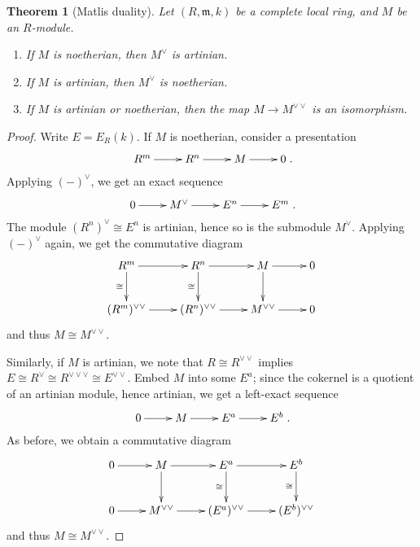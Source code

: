 \documentclass[11pt]{book}
\newtheorem{theorem}{Theorem}[chapter]
\numberwithin{equation}{section}
\numberwithin{theorem}{chapter}
\theoremstyle{definition}
\newtheorem{example}[theorem]{Example}
\newtheorem*{basic properties}{Basic Properties}
\newtheorem*{Important Remark}{Important Remark}
\theoremstyle{remark}
\newcommand{\m}{\mathfrak{m}}
\begin{document}
%



\begin{theorem}[Matlis duality]
	Let $(R,\m,k)$ be a complete local ring, and $M$ be an $R$-module.
	\begin{enumerate}
		\item If $M$ is noetherian, then $M^\vee$ is artinian.
		\item If $M$ is artinian, then $M^\vee$ is noetherian.
		\item If $M$ is artinian or noetherian, then the map $M \longrightarrow M^{\vee \vee}$ is an isomorphism.
	\end{enumerate}
\end{theorem}

\begin{proof}
	Write $E = E_R(k)$. If $M$ is noetherian, consider a presentation
	$$\xymatrix{R^m \ar[r] & R^n \ar[r] & M \ar[r] & 0}.$$
	Applying $(-)^{\vee}$, we get an exact sequence 
	$$\xymatrix{0 \ar[r] & M^{\vee} \ar[r] & E^n \ar[r] & E^m}.$$
	The module $(R^n)^{\vee} \cong E^n$ is artinian, hence so is the submodule $M^{\vee}$. Applying $(-)^{\vee}$ again, we get the commutative diagram
	$$\xymatrix{R^m \ar[d]_-{\cong} \ar[r] & R^n \ar[d]_-{\cong} \ar[r] & M \ar[d] \ar[r] & 0 \\
	(R^m)^{\vee \vee} \ar[r] & (R^n)^{\vee \vee} \ar[r] & M^{\vee \vee} \ar[r] & 0}$$
	and thus $M \cong M^{\vee \vee}$.
	
	Similarly, if $M$ is artinian, we note that $R\cong R^{\vee\vee}$ implies $E \cong R^{\vee} \cong R^{\vee \vee \vee} \cong E^{\vee\vee}$. Embed $M$ into some $E^a$; since the cokernel is a quotient of an artinian module, hence artinian, we get a left-exact sequence
	$$\xymatrix{0 \ar[r] & M \ar[r] & E^a \ar[r] & E^b}.$$
	As before, we obtain a commutative diagram
		$$ \xymatrix{ 0 \ar[r] & M\ar[d] \ar[r] &E^a \ar[d]_-{\cong} \ar[r] & E^b \ar[d]_-{\cong}  \\ 
		 0 \ar[r] & M^{\vee \vee} \ar[r] &(E^a)^{\vee \vee} \ar[r] & (E^b)^{\vee \vee} }$$
	 and thus $M \cong M^{\vee\vee}$.
\end{proof}
\end{document}
